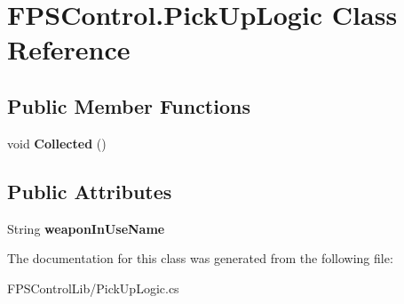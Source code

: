 \hypertarget{class_f_p_s_control_1_1_pick_up_logic}{\section{F\-P\-S\-Control.\-Pick\-Up\-Logic Class Reference}
\label{class_f_p_s_control_1_1_pick_up_logic}
}
\subsection*{Public Member Functions}
\begin{DoxyCompactItemize}
\item 
\hypertarget{class_f_p_s_control_1_1_pick_up_logic_a25d551d7505d7c5ec39d8352aabd7faa}{void {\bfseries Collected} ()}\label{class_f_p_s_control_1_1_pick_up_logic_a25d551d7505d7c5ec39d8352aabd7faa}

\end{DoxyCompactItemize}
\subsection*{Public Attributes}
\begin{DoxyCompactItemize}
\item 
\hypertarget{class_f_p_s_control_1_1_pick_up_logic_ab23efbbad8a507041a74dbe8dd920401}{String {\bfseries weapon\-In\-Use\-Name}}\label{class_f_p_s_control_1_1_pick_up_logic_ab23efbbad8a507041a74dbe8dd920401}

\end{DoxyCompactItemize}


The documentation for this class was generated from the following file\-:\begin{DoxyCompactItemize}
\item 
F\-P\-S\-Control\-Lib/Pick\-Up\-Logic.\-cs\end{DoxyCompactItemize}
